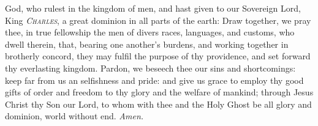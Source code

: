  God, who rulest in the kingdom of men, and hast given to our Sovereign Lord, King \textsc{\textit{Charles}}, a great dominion in all parts of the earth: Draw together, we pray thee, in true fellowship the men of divers races, languages, and customs, who dwell therein, that, bearing one another's burdens, and working together in brotherly concord, they may fulfil the purpose of thy providence, and set forward thy everlasting kingdom. Pardon, we beseech thee our sins and shortcomings: keep far from us an selfishness and pride: and give us grace to employ thy good gifts of order and freedom to thy glory and the welfare of mankind; through Jesus Christ thy Son our Lord, to whom with thee and the Holy Ghost be all glory and dominion, world without end. \textit{Amen.}

